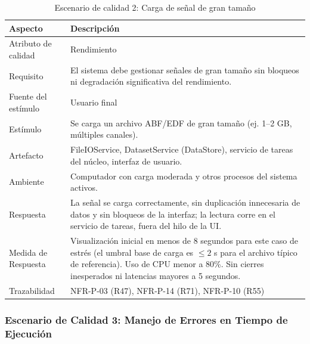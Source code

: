 \documentclass[11pt,a4paper]{article}
\DeclareRobustCommand{\_}{\textunderscore\allowbreak}
\begin{document}
\begin{table}[H]
\centering
\caption{Escenario de calidad 2: Carga de señal de gran tamaño}
\label{tab:escenario2}
\begin{tabularx}{\textwidth}{|l|X|}
\hline
\textbf{Aspecto} & \textbf{Descripción} \\
\hline
Atributo de calidad & Rendimiento \\
\hline
Requisito & El sistema debe gestionar señales de gran tamaño sin bloqueos ni degradación significativa del rendimiento. \\
\hline
Fuente del estímulo & Usuario final \\
\hline
Estímulo & Se carga un archivo ABF/EDF de gran tamaño (ej. 1--2 GB, múltiples canales). \\
\hline
Artefacto & FileIOService, DatasetService (DataStore), servicio de tareas del núcleo, interfaz de usuario. \\
\hline
Ambiente & Computador con carga moderada y otros procesos del sistema activos. \\
\hline
Respuesta & La señal se carga correctamente, sin duplicación innecesaria de datos y sin bloqueos de la interfaz; la lectura corre en el servicio de tareas, fuera del hilo de la UI. \\
\hline
Medida de Respuesta & Visualización inicial en menos de 8 segundos para este caso de estrés (el umbral base de carga es $\leq 2$ s para el archivo típico de referencia). Uso de CPU menor a 80\%. Sin cierres inesperados ni latencias mayores a 5 segundos. \\
\hline
Trazabilidad & NFR-P-03 (R47), NFR-P-14 (R71), NFR-P-10 (R55) \\
\hline
\end{tabularx}
\end{table}

\subsubsection{Escenario de Calidad 3: Manejo de Errores en Tiempo de Ejecución}
\end{document}
